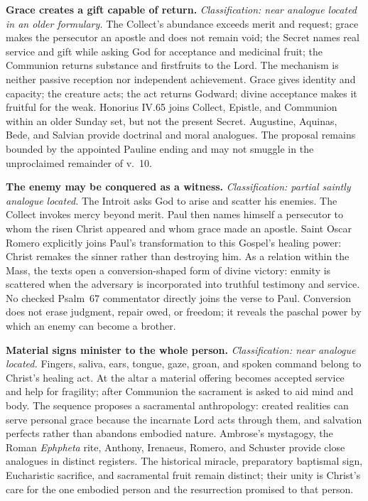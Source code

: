 \noindent\textbf{Grace creates a gift capable of return.\enspace{}}
\emph{Classification: near analogue located in an older formulary.} The
Collect's abundance exceeds merit and request; grace makes the persecutor an
apostle and does not remain void; the Secret names real service and gift while
asking God for acceptance and medicinal fruit; the Communion returns substance
and firstfruits to the Lord. The mechanism is neither passive reception nor
independent achievement. Grace gives identity and capacity; the creature acts;
the act returns Godward; divine acceptance makes it fruitful for the weak.
Honorius IV.65 joins Collect, Epistle, and Communion within an older Sunday set,
but not the present Secret. Augustine, Aquinas, Bede, and Salvian provide
doctrinal and moral analogues. The proposal remains bounded by the appointed
Pauline ending and may not smuggle in the unproclaimed remainder of v.~10.

\noindent\textbf{The enemy may be conquered as a witness.\enspace{}}
\emph{Classification: partial saintly analogue located.} The Introit asks God
to arise and scatter his enemies. The Collect invokes mercy beyond merit. Paul
then names himself a persecutor to whom the risen Christ appeared and whom
grace made an apostle. Saint Oscar Romero explicitly joins Paul's transformation
to this Gospel's healing power: Christ remakes the sinner rather than
destroying him. As a relation within the Mass, the texts open a conversion-shaped
form of divine victory: enmity is scattered when the adversary is incorporated
into truthful testimony and service. No checked Psalm~67 commentator directly
joins the verse to Paul. Conversion does not erase judgment, repair owed, or
freedom; it reveals the paschal power by which an enemy can become a brother.

\noindent\textbf{Material signs minister to the whole person.\enspace{}}
\emph{Classification: near analogue located.} Fingers, saliva, ears, tongue,
gaze, groan, and spoken command belong to Christ's healing act. At the altar a
material offering becomes accepted service and help for fragility; after
Communion the sacrament is asked to aid mind and body. The sequence proposes a
sacramental anthropology: created realities can serve personal grace because
the incarnate Lord acts through them, and salvation perfects rather than
abandons embodied nature. Ambrose's mystagogy, the Roman \emph{Ephpheta} rite,
Anthony, Irenaeus, Romero, and Schuster provide close analogues in distinct
registers. The historical miracle, preparatory baptismal sign, Eucharistic
sacrifice, and sacramental fruit remain distinct; their unity is Christ's care
for the one embodied person and the resurrection promised to that person.

